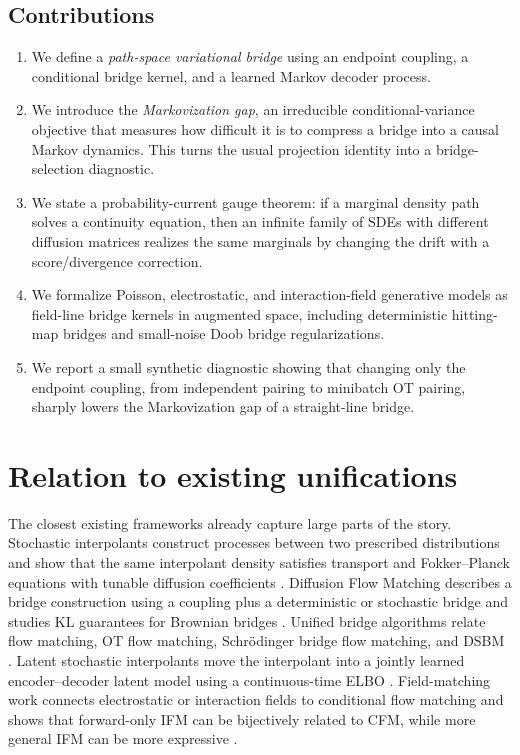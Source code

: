 \documentclass[twoside,11pt]{jmlr}
\numberwithin{equation}{section}
\begin{document}
\subsection{Contributions}

\begin{enumerate}[leftmargin=2em]
    \item We define a \emph{path-space variational bridge} using an endpoint coupling, a conditional bridge kernel, and a learned Markov decoder process.
    \item We introduce the \emph{Markovization gap}, an irreducible conditional-variance objective that measures how difficult it is to compress a bridge into a causal Markov dynamics. This turns the usual projection identity into a bridge-selection diagnostic.
    \item We state a probability-current gauge theorem: if a marginal density path solves a continuity equation, then an infinite family of SDEs with different diffusion matrices realizes the same marginals by changing the drift with a score/divergence correction.
    \item We formalize Poisson, electrostatic, and interaction-field generative models as field-line bridge kernels in augmented space, including deterministic hitting-map bridges and small-noise Doob bridge regularizations.
    \item We report a small synthetic diagnostic showing that changing only the endpoint coupling, from independent pairing to minibatch OT pairing, sharply lowers the Markovization gap of a straight-line bridge.
\end{enumerate}

\section{Relation to existing unifications}
\label{sec:positioning}

The closest existing frameworks already capture large parts of the story. Stochastic interpolants construct processes between two prescribed distributions and show that the same interpolant density satisfies transport and Fokker--Planck equations with tunable diffusion coefficients \citep{albergo2023stochastic}. Diffusion Flow Matching describes a bridge construction using a coupling plus a deterministic or stochastic bridge and studies KL guarantees for Brownian bridges \citep{silveri2024dfm}. Unified bridge algorithms relate flow matching, OT flow matching, Schr\"odinger bridge flow matching, and DSBM \citep{kim2025unified}. Latent stochastic interpolants move the interpolant into a jointly learned encoder--decoder latent model using a continuous-time ELBO \citep{singh2025lsi}. Field-matching work connects electrostatic or interaction fields to conditional flow matching and shows that forward-only IFM can be bijectively related to CFM, while more general IFM can be more expressive \citep{shlenskii2026duality}.
\end{document}
